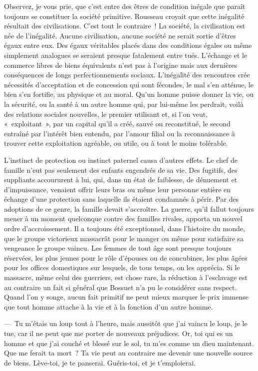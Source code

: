 \documentclass[french,twoside]{book} %
\begin{document}
Observez, je vous prie, que c’est entre des êtres de condition inégale que paraît toujours se constituer la société primitive. Rousseau croyait que cette inégalité résultait des civilisations. C’est tout le contraire ! La société, la civilisation est née de l’inégalité. Aucune civilisation, aucune société ne serait sortie d’êtres égaux entre eux. Des égaux véritables placés dans des conditions égales ou même simplement analogues se seraient presque fatalement entre tués. L’échange et le commerce libres de biens équivalents n’est pas à l’origine mais aux dernières conséquences de longs perfectionnements sociaux. L’inégalité des rencontres crée nécessités d’acceptation et de concession qui sont fécondes, le mal s’en atténue, le bien s’en fortifie, au physique et au moral. Qu’un homme puisse donner la vie, ou la sécurité, ou la santé à un autre homme qui, par lui-même les perdrait, voilà des relations sociales nouvelles, le premier utilisant et, si l’on veut, « exploitant », par un capital qu’il a créé, sauvé ou reconstitué, le second entraîné par l’intérêt bien entendu, par l’amour filial ou la reconnaissance à trouver cette exploitation agréable, ou utile, ou à tout le moins tolérable.\par
L’instinct de protection ou instinct paternel causa d’autres effets. Le chef de famille n’eut pas seulement des enfants engendrés de sa vie. Des fugitifs, des suppliants accoururent à lui, qui, dans un état de faiblesse, de dénuement et d’impuissance, venaient offrir leurs bras ou même leur personne entière en échange d’une protection sans laquelle ils étaient condamnés à périr. Par des adoptions de ce genre, la famille devait s’accroître. La guerre, qu’il fallut toujours mener à un moment quelconque contre des familles rivales, apporta un nouvel ordre d’accroissement. Il a toujours été exceptionnel, dans l’histoire du monde, que le groupe victorieux massacrât pour le manger ou même pour satisfaire sa vengeance le groupe vaincu. Les femmes de tout âge sont presque toujours réservées, les plus jeunes pour le rôle d’épouses ou de concubines, les plus âgées pour les offices domestiques sur lesquels, de tous temps, on les apprécia. Si le massacre, même celui des guerriers, est chose rare, la réduction à l’esclavage est au contraire un fait si général que Bossuet n’a pu le considérer sans respect. Quand l’on y songe, aucun fait primitif ne peut mieux marquer le prix immense que tout homme attache à la vie et à la fonction d’un autre homme.\par
— Tu m’étais un loup tout à l’heure, mais aussitôt que j’ai vaincu le loup, je le tue, car il ne peut que me porter de nouveaux préjudices. Or, toi qui es un homme et que j’ai couché et blessé sur le sol, tu m’es comme un dieu maintenant. Que me ferait ta mort ? Ta vie peut au contraire me devenir une nouvelle source de biens. Lève-toi, je te panserai. Guéris-toi, et je t’emploierai.\par
\end{document}
